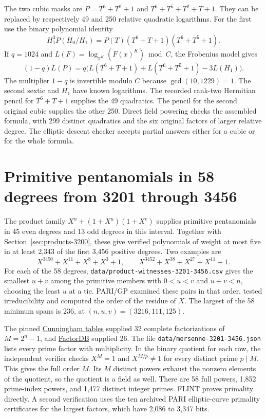 \documentclass[11pt]{article}
\begin{document}
The two cubic masks are \(P=T^3+T^2+1\) and
\(T^6+T^5+T^2+T+1\). They can be replaced by respectively 49 and
250 relative quadratic logarithms. For the first use the binary
polynomial identity
\[
 H_1^3 P(H_0/H_1)
     =P(T)(T^6+T+1)(T^6+T^5+1).
\]
If \(q=1024\) and \(L(F)=\log_{x^K}(F(x)^K)\bmod C\), the
Frobenius model gives
\[
 (1-q)L(P)=q\big(L(T^6+T+1)+L(T^6+T^5+1)-3L(H_1)\big).
\]
The multiplier \(1-q\) is invertible modulo \(C\) because
\(\gcd(10,1229)=1\). The second sextic and \(H_1\) have known
logarithms. The recorded rank-two Hermitian pencil for \(T^6+T+1\)
supplies the 49 quadratics. The pencil for the second original cubic
supplies the other 250. Direct field powering checks the assembled
formula, with 299 distinct quadratics and the six original factors
of larger relative degree. The elliptic descent checker accepts
partial answers either for a cubic or for the whole formula.

\section{Primitive pentanomials in 58 degrees from 3201 through 3456}
\label{sec:products-3456}
The product family \(X^n+(1+X^u)(1+X^v)\) supplies primitive
pentanomials in 45 even degrees and 13 odd degrees in this interval.
Together with Section~\ref{sec:products-3200}, these give verified
polynomials of weight at most five in at least 2,343 of the first
3,456 positive degrees. Two examples are
\[
 X^{3450}+X^{11}+X^8+X^3+1,\qquad
 X^{3452}+X^{38}+X^{27}+X^{11}+1 .
\]
For each of the 58 degrees, \nolinkurl{data/product-witnesses-3201-3456.csv}
gives the smallest \(u+v\) among the primitive members with
\(0<u<v\) and \(u+v<n\), choosing the least \(u\) at a tie.
PARI/GP examined these pairs in that order, tested irreducibility
and computed the order of the residue of \(X\). The largest of the
58 minimum spans is 236, at \((n,u,v)=(3216,111,125)\).

The pinned \href{https://github.com/postvakje/Reformatted-Cunningham-Project-tables/tree/dff2e282ff15399b16b4fb840a410aa2a37076b7}{Cunningham tables}
supplied 32 complete factorizations of \(M=2^n-1\), and
\href{https://factordb.com/index.php?query=2\%5E3451-1}{FactorDB}
supplied 26. The file \nolinkurl{data/mersenne-3201-3456.json} lists
every prime factor with multiplicity. In the binary quotient for
each row, the independent verifier checks \(X^M=1\) and
\(X^{M/p}\ne1\) for every distinct prime \(p\mid M\). This gives
the full order \(M\). Its \(M\) distinct powers exhaust the nonzero
elements of the quotient, so the quotient is a field as well.
There are 58 full powers, 1,852 prime-index powers, and 1,477
distinct integer primes. FLINT proves primality directly. A second
verification uses the ten archived PARI elliptic-curve primality
certificates for the largest factors, which have 2,086 to 3,347 bits.
\end{document}
